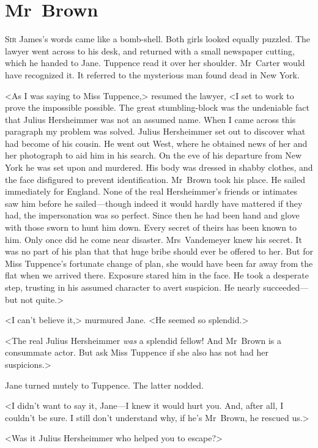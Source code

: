 \chapter{Mr~Brown} 

 \lettrine{S}{ir} James's words came like a bomb-shell. Both girls looked equally puzzled. The lawyer went across to his desk, and returned with a small newspaper cutting, which he handed to Jane. Tuppence read it over her shoulder. Mr~Carter would have recognized it. It referred to the mysterious man found dead in New York.

<As I was saying to Miss Tuppence,> resumed the lawyer, <I set to work to prove the impossible possible. The great stumbling-block was the undeniable fact that Julius Hersheimmer was not an assumed name. When I came across this paragraph my problem was solved. Julius Hersheimmer set out to discover what had become of his cousin. He went out West, where he obtained news of her and her photograph to aid him in his search. On the eve of his departure from New York he was set upon and murdered. His body was dressed in shabby clothes, and the face disfigured to prevent identification. Mr~Brown took his place. He sailed immediately for England. None of the real Hersheimmer's friends or intimates saw him before he sailed—though indeed it would hardly have mattered if they had, the impersonation was so perfect. Since then he had been hand and glove with those sworn to hunt him down. Every secret of theirs has been known to him. Only once did he come near disaster. Mrs~Vandemeyer knew his secret. It was no part of his plan that that huge bribe should ever be offered to her. But for Miss Tuppence's fortunate change of plan, she would have been far away from the flat when we arrived there. Exposure stared him in the face. He took a desperate step, trusting in his assumed character to avert suspicion. He nearly succeeded—but not quite.>

<I can't believe it,> murmured Jane. <He seemed so splendid.>

<The real Julius Hersheimmer \emph{was} a splendid fellow! And Mr~Brown is a consummate actor. But ask Miss Tuppence if she also has not had her suspicions.>

Jane turned mutely to Tuppence. The latter nodded.

<I didn't want to say it, Jane—I knew it would hurt you. And, after all, I couldn't be sure. I still don't understand why, if he's Mr~Brown, he rescued us.>

<Was it Julius Hersheimmer who helped you to escape?>

